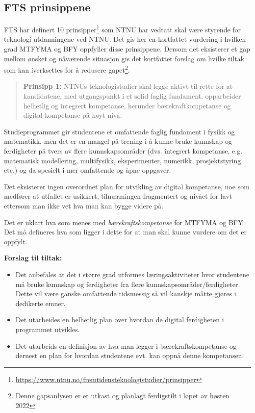\subsection{FTS prinsippene}
\label{sec:fts-principles}
FTS har definert 10 prinsipper\footnote{\url{https://www.ntnu.no/fremtidensteknologistudier/prinsipper}} som NTNU har vedtatt skal være styrende for teknologi-utdanningene ved NTNU. Det gis her en kortfattet vurdering i hvilken grad MTFYMA og BFY oppfyller disse prinsippene. Dersom det eksisterer et gap mellom ønsket og nåværende situasjon gis det kortfattet forslag om hvilke tiltak som kan iverksettes for å redusere gapet\footnote{Denne gapsanlysen er et utkast og planlagt ferdigstilt i løpet av høsten 2022}.

\begin{quote}
	\textbf{Prinsipp 1:} NTNUs teknologistudier skal legge aktivt til rette for at kandidatene, med utgangspunkt i et solid faglig fundament, opparbeider helhetlig og integrert kompetanse, herunder bærekraftkompetanse og digital kompetanse på høyt nivå.
\end{quote}

Studieprogrammet gir studentene et omfattende faglig fundament i fysikk og matematikk, men det er en mangel på trening i å kunne bruke kunnskap og ferdigheter på tvers av flere kunnskapsområder (dvs. integrert kompetanse, e.g. matematisk modellering, multifysikk, eksperimenter, numerikk, prosjektstyring, etc.) og da spesielt i mer omfattende og åpne oppgaver.

Det eksisterer ingen overordnet plan for utvikling av digital kompetanse, noe som medfører at utfallet er usikkert, tilnærmingen fragmentert og nivået for lavt ettersom man ikke vet hva man kan bygge videre på.

Det er uklart hva som menes med \emph{bærekraftskompetanse} for MTFYMA og BFY. Det må defineres hva som ligger i dette for at man skal kunne vurdere om det er oppfylt.

\textbf{Forslag til tiltak:}
\begin{itemize}
	\item Det anbefales at det i større grad utformes læringsaktiviteter hvor studentene må bruke kunnskap og ferdigheter fra flere kunnskapsområder/ferdigheter. Dette vil være ganske omfattende tidsmessig så vil kanskje måtte gjøres i dedikerte emner.
	\item Det utarbeides en helhetlig plan over hvordan de digital ferdigheten i programmet utvikles.
	\item Det utarbeids en definisjon av hva man legger i bærekraftskompetanse og dernest en plan for hvordan studentene evt. kan oppnå denne kompetansen.
\end{itemize}

